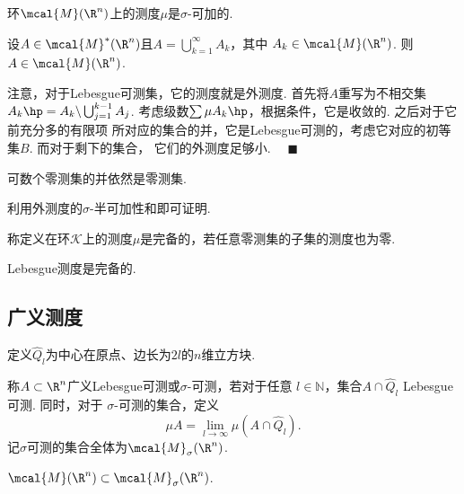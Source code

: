   \begin{thm}
    环$\mcal{M}(\R^n)$上的测度$\mu$是$\sigma$-可加的.
  \end{thm}

  \begin{thm}
    \label{thm: 可数并可测}
    设$A\in \mcal{M}^*(\R^n)$且$A=\bigcup_{k=1}^\infty A_k$，其中
    $A_k\in\mcal{M}(\R^n)$. 则$A\in\mcal{M}(\R^n)$.
  \end{thm}
  \remark
    注意，对于Lebesgue可测集，它的测度就是外测度.
  \proof
    首先将$A$重写为不相交集$A_k\hp=A_k\backslash\bigcup_{j=1}^{k-1}A_j$.
    考虑级数$\sum\mu A_k\hp$，根据条件，它是收敛的. 之后对于它前充分多的有限项
    所对应的集合的并，它是Lebesgue可测的，考虑它对应的初等集$B$. 而对于剩下的集合，
    它们的外测度足够小. $\quad\blacksquare$

  \begin{cor}
    可数个零测集的并依然是零测集.
  \end{cor}
  \proof
    利用外测度的$\sigma$-半可加性和即可证明.

  \begin{defi}[完备]
    称定义在环$\mathcal{K}$上的测度$\mu$是完备的，若任意零测集的子集的测度也为零.
  \end{defi}

  \begin{thm}
    Lebesgue测度是完备的.
  \end{thm}

\subsection{广义测度}

  \begin{defi}
    定义$\hat{Q}_l$为中心在原点、边长为$2l$的$n$维立方块.
  \end{defi}

  \begin{defi}[$\sigma$-可测]
    \label{defi: sigma-可测}
    称$A\subset\R^n$广义Lebesgue可测或$\sigma$-可测，若对于任意
    $l\in\mathbb{N}$，集合$A\cap\hat{Q}_l$ Lebesgue可测. 同时，对于
    $\sigma$-可测的集合，定义
    \begin{equation}
      \label{equ: sigma-测度}
      \mu A = \lim_{l\to\infty}\mu(A\cap \hat{Q}_l).
    \end{equation}
    记$\sigma$可测的集合全体为$\mcal{M}_{\sigma}(\R^n)$.
  \end{defi}

  \begin{thm}
    $\mcal{M}(\R^n)\subset\mcal{M}_{\sigma}(\R^n)$.
  \end{thm}

